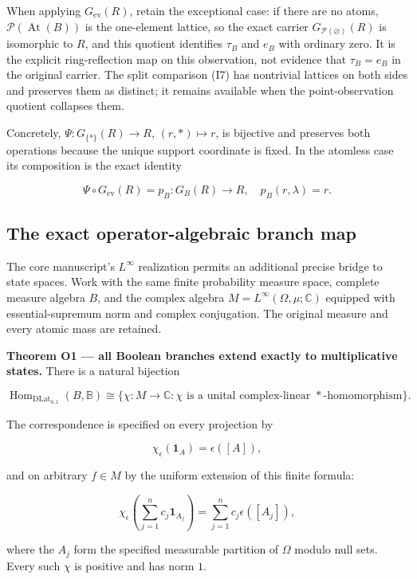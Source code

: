 When applying \(G_{\operatorname{ev}}(R)\), retain the exceptional case: if there are no atoms, \(\mathcal P(\operatorname{At}(B))\) is the one-element lattice, so the exact carrier \(G_{\mathcal P(\varnothing)}(R)\) is isomorphic to \(R\), and this quotient identifies \(\tau _B\) and \(e_B\) with ordinary zero. It is the explicit ring-reflection map on this observation, not evidence that \(\tau _B=e_B\) in the original carrier. The split comparison (I7) has nontrivial lattices on both sides and preserves them as distinct; it remains available when the point-observation quotient collapses them.

Concretely, \(\Psi:G_{\{*\}}(R)\to R\), \((r,*)\mapsto r\), is bijective and preserves both operations because the unique support coordinate is fixed. In the atomless case its composition is the exact identity

\[
\Psi\circ G_{\mathrm{ev}}(R)=p_B:G_B(R)\to R,
\quad p_B(r,\lambda)=r.
\tag{A4}
\]

\subsection{The exact operator-algebraic branch map}\label{historical-support-the-exact-operator-algebraic-branch-map}

The core manuscript's \(L^\infty\) realization permits an additional precise bridge to state spaces. Work with the same finite probability measure space, complete measure algebra \(B\), and the complex algebra \(M=L^\infty(\Omega,\mu;\mathbb C)\) equipped with essential-supremum norm and complex conjugation. The original measure and every atomic mass are retained.

\textbf{Theorem O1 --- all Boolean branches extend exactly to multiplicative states.} There is a natural bijection

\[
\operatorname{Hom}_{\mathrm{DLat}_{0,1}}(B,\mathbb B)
\cong\{\chi:M\to\mathbb C:\chi\text{ is a unital complex-linear }*\text{-homomorphism}\}.
\tag{O1}
\]

The correspondence is specified on every projection by

\[
\chi_\epsilon(\mathbf1_A)=\epsilon([A]),
\tag{O2}
\]

and on arbitrary \(f\in M\) by the uniform extension of this finite formula:

\[
\chi_\epsilon\left(\sum_{j=1}^n c_j\mathbf1_{A_j}\right)
=\sum_{j=1}^n c_j\epsilon([A_j]),
\tag{O3}
\]

where the \(A_j\) form the specified measurable partition of \(\Omega\) modulo null sets. Every such \(\chi\) is positive and has norm \(1\).

